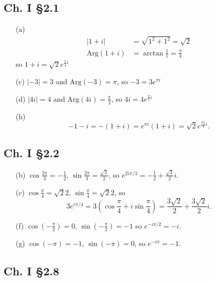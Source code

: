 \documentclass{article}
\begin{document}
\subsection*{Ch. I \S 2.1}
\begin{itemize}
  \item[(a)]{
    \begin{align*}
      |1 + i| &= \sqrt{1^2 + 1^2} = \sqrt{2} \\
      \mathrm{Arg}(1 + i) &= \arctan \frac{1}{1} = \frac{\pi}{4}
    \end{align*}
    so $1 + i = \sqrt{2}e^{\frac{\pi}{4} i}$
  }
  \item[(c)]{
    $|-3| = 3$ and $\mathrm{Arg}(-3) = \pi$, so
    $-3 = 3e^{\pi i}$
  }
  \item[(d)]{
    $|4i| = 4$ and $\mathrm{Arg}(4i) = \frac{\pi}{2}$, so
    $4i = 4e^{\frac{\pi}{2} i}$
  }
  \item[(h)]{
    $$
      -1 - i
    = -(1+i)
    = e^{\pi i} (1 + i)
    = \sqrt{2}e^{\frac{7\pi}{4} i}.
    $$
  }
\end{itemize}

\subsection*{Ch. I \S 2.2}
\begin{itemize}
  \item[(b)]{
    $\cos \frac{2 \pi}{3} = -\frac{1}{2}$,
    $\sin \frac{2 \pi}{3} = \frac{\sqrt{3}}{2}$,
    so $e^{2 i \pi / 3} = -\frac{1}{2} + \frac{\sqrt{3}}{2} i$.
  }
  \item[(c)]{
    $\cos \frac{\pi}{4} = \sqrt{2}{2}$,
    $\sin \frac{\pi}{4} = \sqrt{2}{2}$,
    so
    $$
      3 e^{i \pi / 4}
    = 3(\cos \frac{\pi}{4} + i \sin \frac{\pi}{4})
    = \frac{3 \sqrt{2}}{2} + \frac{3 \sqrt{2}}{2} i.
    $$
  }
  \item[(f)]{
    $\cos \left(-\frac{\pi}{2}\right) = 0$,
    $\sin \left(-\frac{\pi}{2}\right) = -1$
    so $e^{-i \pi / 2} = -i$.
  }
  \item[(g)]{
    $\cos (-\pi) = -1$,
    $\sin (-\pi) = 0$,
    so $e^{-i\pi} = -1$.
  }
\end{itemize}

\subsection*{Ch. I \S 2.8}
\end{document}
